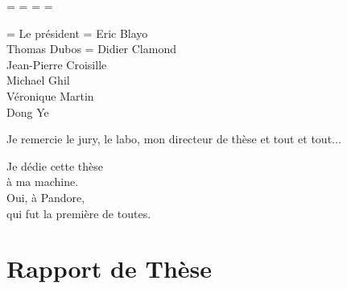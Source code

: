 \documentclass[11pt]{thesul}
\begin{document}
      \OddHead={{\leftmark\rightmark}{\hfil\slshape\rightmark}}
      \EvenHead={{\leftmark}{{\slshape\leftmark}\hfil}}
      \OddFoot={\hfil\thepage}
      \EvenFoot={\thepage\hfil}
      \pagestyle{ThesisHeadingsII}

\FrameChaptersInToc  
\ResetChaptersAtParts 
\dominitoc

\ThesisUL

\def\blanc{\hspace*{1cm}}

\President    = {Le président}
\Rapporteurs  = {Eric Blayo\\
                 Thomas Dubos}
\Examinateurs = {Didier Clamond\\
				 Jean-Pierre Croisille\\
				 Michael Ghil\\
				 Véronique Martin\\
                 Dong Ye}

\MakeThesisTitlePage

\begin{ThesisAcknowledgments}
Je remercie le jury, le labo, mon directeur de thèse et tout et tout...
\end{ThesisAcknowledgments}

\begin{ThesisDedication}
Je dédie cette thèse\\
à ma machine.\\
Oui, à Pandore,\\
qui fut la première de toutes.
\end{ThesisDedication}

\WritePartLabelInToc
\WriteChapterLabelInToc

\tableofcontents


\DontNumberThisInToc

\DontWriteThisInToc   
\listoffigures

\WriteThisInToc
\FrameThisInToc
\NumberThisInToc
\part*{Rapport de Thèse}
\mainmatter
\end{document}
